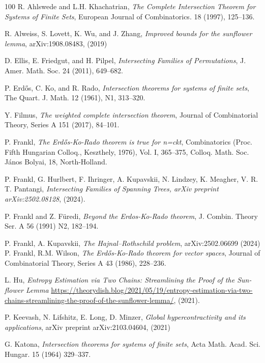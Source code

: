 \documentclass[11pt,letterpaper]{amsart}
\begin{document}
\begin{thebibliography}{100}
 R. Ahlswede and L.H. Khachatrian, {\it The Complete Intersection Theorem for Systems of Finite Sets}, European Journal of Combinatorics. 18 (1997), 125--136.


 R. Alweiss, S. Lovett, K. Wu, and J. Zhang, {\it Improved bounds for the sunflower lemma}, arXiv:1908.08483, (2019)

 D. Ellis, E. Friedgut, and H. Pilpel, {\it Intersecting Families of Permutations}, J. Amer. Math. Soc. 24 (2011), 649--682.

 P. Erd\H os, C. Ko, and R. Rado, \textit{Intersection theorems for systems of finite sets}, The Quart. J. Math. 12 (1961), N1, 313--320.

 Y. Filmus, {\it The weighted complete intersection theorem}, Journal of Combinatorial Theory, Series A 151 (2017), 84--101. 



 P. Frankl, \textit{The Erd\H os-Ko-Rado theorem is true for n=ckt}, Combinatorics (Proc. Fifth Hungarian Colloq., Keszthely, 1976), Vol. I, 365--375, Colloq. Math. Soc. J\'anos Bolyai, 18, North-Holland.


 P. Frankl, G. Hurlbert, F. Ihringer, A. Kupavskii, N. Lindzey, K. Meagher, V. R. T. Pantangi, {\it Intersecting Families of Spanning Trees, arXiv preprint  arXiv:2502.08128}, (2024).


 P. Frankl and Z. F\"uredi, \textit{Beyond the Erdos-Ko-Rado theorem},  J. Combin.  Theory Ser. A  56 (1991) N2, 182--194.

 P. Frankl, A. Kupavskii, {\it The Hajnal--Rothschild problem}, arXiv:2502.06699 (2024)
 P. Frankl, R.M. Wilson, {\it The Erd\H os-Ko-Rado theorem for vector spaces}, Journal of Combinatorial Theory, Series A 43 (1986), 228--236. 


 L. Hu, {\it Entropy Estimation via Two Chains: Streamlining the Proof of the Sun-
flower Lemma} \url {https://theorydish.blog/2021/05/19/entropy-estimation-via-two-chains-streamlining-the-proof-of-the-sunflower-lemma/}, (2021).

 P. Keevash, N. Lifshitz, E. Long, D. Minzer, {\it Global hypercontractivity and its applications}, arXiv preprint  arXiv:2103.04604, (2021)

 G. Katona, {\it Intersection theorems for systems of finite sets}, Acta Math. Acad. Sci. Hungar. 15 (1964) 329--337.


\end{thebibliography}
\end{document}
